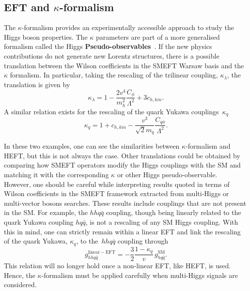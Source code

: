 \subsection{EFT and $\kappa$-formalism \label{eftkappa}}
\par The $\kappa$-formalism provides an experimentally accessible approach to study the Higgs boson properties. The $\kappa$ parameters are part of a more generalised formalism called the Higgs \textbf{Pseudo-observables}~\cite{Gonzalez-Alonso:2014eva}. 
If the new physics contributions do not generate new Lorentz structures, there is a possible translation between the Wilson coefficients in the SMEFT Warsaw basis and the $\kappa$ formalism. In particular, taking the rescaling of the trilinear coupling, $\kappa_\lambda$, the translation is given by
\begin{equation}
	\kappa_\lambda = 1-\frac{2v^4}{m_h^2} \frac{C_\phi}{\Lambda^2}+3 c_{h,kin}.
\end{equation}
A similar relation exists for the rescaling of the quark Yukawa couplings~$\kappa_q$
\begin{equation}
	\kappa_q = 1+c_{h,kin}- \frac{v^3}{\sqrt{2}m_q}\frac{C_{q\phi}}{\Lambda^2}.
\end{equation}
\par In these two examples, one can see the similarities between $\kappa$-formalism and HEFT, but this is not always the case.  Other translations could be obtained by comparing how SMEFT operators modify the Higgs couplings with the SM and matching it with the corresponding $\kappa$ or other Higgs pseudo-observable.\\ 
However, one should be careful while interpreting results quoted in terms of Wilson coefficients in the SMEFT framework extracted from multi-Higgs or multi-vector bosons searches. These results include couplings that are not present in the SM. For example, the $hh q\bar{q}$ coupling, though being linearly related to the quark Yukawa coupling $h q\bar{q}$, is not a rescaling of any SM Higgs coupling. With this in mind, one can strictly remain within a linear EFT and link the rescaling of the quark Yukawa, $\kappa_q$, to the~$hh q\bar{q}$ coupling through
\begin{equation}
	g_{hhq\bar{q}}^{\mathrm{linear-EFT}} = -\frac{3}{2}\frac{1-\kappa_q}{v} \, g_{h q\bar{q}}^{\mathrm{SM}}.
\end{equation}
This relation will no longer hold once a non-linear EFT, like HEFT, is used. Hence, the $\kappa$-formalism must be applied carefully when multi-Higgs signals are considered.
